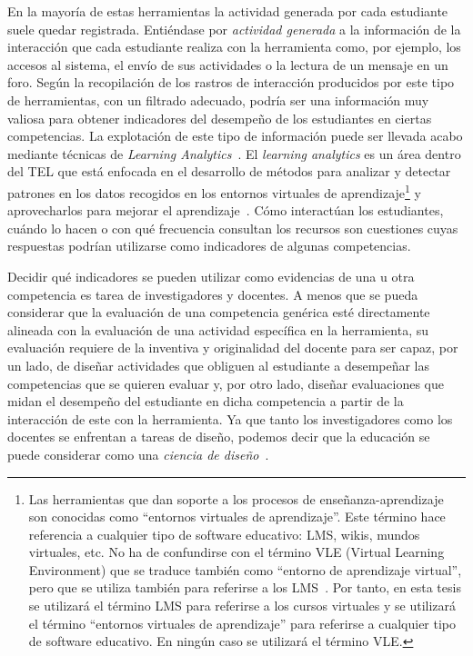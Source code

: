 En la mayoría de estas herramientas la actividad generada por cada estudiante suele quedar registrada. Entiéndase por \emph{actividad generada} a la información de la interacción que cada estudiante realiza con la herramienta como, por ejemplo, los accesos al sistema, el envío de sus actividades o la lectura de un mensaje en un foro. Según \cite{Chebil:2012, Florian:2011} la recopilación de los rastros de interacción producidos por este tipo de herramientas, con un filtrado adecuado, podría ser una información muy valiosa para obtener indicadores del desempeño de los estudiantes en ciertas competencias. La explotación de este tipo de información puede ser llevada acabo mediante técnicas de \emph{Learning Analytics}~\cite{conde2015exploring}. El \emph{learning analytics} es un área dentro del TEL que está enfocada en el desarrollo de métodos para analizar y detectar patrones en los datos recogidos en los entornos virtuales de aprendizaje\footnote{Las herramientas que dan soporte a los procesos de enseñanza-aprendizaje son conocidas como ``entornos virtuales de aprendizaje''. Este término hace referencia a cualquier tipo de software educativo: LMS, wikis, mundos virtuales, etc. No ha de confundirse con el término VLE (Virtual Learning Environment) que se traduce también como ``entorno de aprendizaje virtual'', pero que se utiliza también para referirse a los LMS~\cite{alario2013glue}. Por tanto, en esta tesis se utilizará el término LMS para referirse a los cursos virtuales y se utilizará el término ``entornos virtuales de aprendizaje'' para referirse a cualquier tipo de software educativo. En ningún caso se utilizará el término VLE.} y aprovecharlos para mejorar el aprendizaje~\cite{chatti2014learning}.  Cómo interactúan los estudiantes, cuándo lo hacen o con qué frecuencia consultan los recursos son cuestiones cuyas respuestas podrían utilizarse como indicadores de algunas competencias. 

Decidir qué indicadores se pueden utilizar como evidencias de una u otra competencia es tarea de investigadores y docentes. A menos que se pueda considerar que la evaluación de una competencia genérica esté directamente alineada con la evaluación de una actividad específica en la herramienta, su evaluación requiere de la inventiva y originalidad del docente para ser capaz, por un lado, de diseñar actividades que obliguen al estudiante a desempeñar las competencias que se quieren evaluar y, por otro lado, diseñar evaluaciones que midan el desempeño del estudiante en dicha competencia a partir de la interacción de este con la herramienta. Ya que tanto los investigadores como los docentes se enfrentan a tareas de diseño, podemos decir que la educación se puede considerar como una \emph{ciencia de diseño}~\cite{laurillard2012teaching}. 

